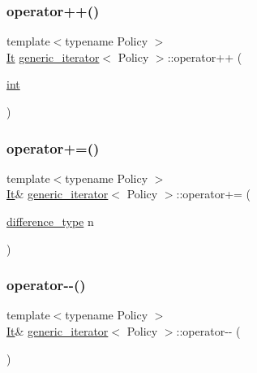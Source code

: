\subsubsection{\texorpdfstring{operator++()}{operator++()}\hspace{0.1cm}{\footnotesize\ttfamily [2/2]}}
{\footnotesize\ttfamily template$<$typename Policy $>$ \\
\mbox{\hyperlink{classgeneric__iterator}{It}} \mbox{\hyperlink{classgeneric__iterator}{generic\+\_\+iterator}}$<$ Policy $>$\+::operator++ (\begin{DoxyParamCaption}\item[{\mbox{\hyperlink{warnings_8h_a74f207b5aa4ba51c3a2ad59b219a423b}{int}}}]{ }\end{DoxyParamCaption})\hspace{0.3cm}{\ttfamily [inline]}}

\mbox{\label{classgeneric__iterator_a06340dad4d45248a6ae5b9648ab6b1ad}} 
\subsubsection{\texorpdfstring{operator+=()}{operator+=()}}
{\footnotesize\ttfamily template$<$typename Policy $>$ \\
\mbox{\hyperlink{classgeneric__iterator}{It}}\& \mbox{\hyperlink{classgeneric__iterator}{generic\+\_\+iterator}}$<$ Policy $>$\+::operator+= (\begin{DoxyParamCaption}\item[{\mbox{\hyperlink{classgeneric__iterator_a307cd6eddc16127eb873d76bcfc07233}{difference\+\_\+type}}}]{n }\end{DoxyParamCaption})\hspace{0.3cm}{\ttfamily [inline]}}

\mbox{\label{classgeneric__iterator_af39d6b4728e3cadca95e673cd31b836e}} 
\subsubsection{\texorpdfstring{operator-\/-\/()}{operator--()}\hspace{0.1cm}{\footnotesize\ttfamily [1/2]}}
{\footnotesize\ttfamily template$<$typename Policy $>$ \\
\mbox{\hyperlink{classgeneric__iterator}{It}}\& \mbox{\hyperlink{classgeneric__iterator}{generic\+\_\+iterator}}$<$ Policy $>$\+::operator-\/-\/ (\begin{DoxyParamCaption}{ }\end{DoxyParamCaption})\hspace{0.3cm}{\ttfamily [inline]}}

